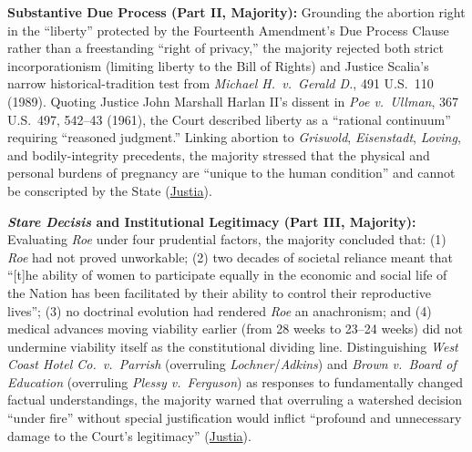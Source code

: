 \documentclass[12pt]{article}
\begin{document}
\textbf{Substantive Due Process (Part II, Majority):} Grounding the abortion right in the ``liberty'' protected by the Fourteenth Amendment's Due Process Clause rather than a freestanding ``right of privacy,'' the majority rejected both strict incorporationism (limiting liberty to the Bill of Rights) and Justice Scalia's narrow historical-tradition test from \textit{Michael H.\ v.\ Gerald D.}, 491 U.S.\ 110 (1989). Quoting Justice John Marshall Harlan II's dissent in \textit{Poe v.\ Ullman}, 367 U.S.\ 497, 542--43 (1961), the Court described liberty as a ``rational continuum'' requiring ``reasoned judgment.'' Linking abortion to \textit{Griswold}, \textit{Eisenstadt}, \textit{Loving}, and bodily-integrity precedents, the majority stressed that the physical and personal burdens of pregnancy are ``unique to the human condition'' and cannot be conscripted by the State (\href{https://supreme.justia.com/cases/federal/us/505/833/}{Justia}).

\textbf{\textit{Stare Decisis} and Institutional Legitimacy (Part III, Majority):} Evaluating \textit{Roe} under four prudential factors, the majority concluded that: (1) \textit{Roe} had not proved unworkable; (2) two decades of societal reliance meant that ``[t]he ability of women to participate equally in the economic and social life of the Nation has been facilitated by their ability to control their reproductive lives''; (3) no doctrinal evolution had rendered \textit{Roe} an anachronism; and (4) medical advances moving viability earlier (from 28 weeks to 23--24 weeks) did not undermine viability itself as the constitutional dividing line. Distinguishing \textit{West Coast Hotel Co.\ v.\ Parrish} (overruling \textit{Lochner}/\textit{Adkins}) and \textit{Brown v.\ Board of Education} (overruling \textit{Plessy v.\ Ferguson}) as responses to fundamentally changed factual understandings, the majority warned that overruling a watershed decision ``under fire'' without special justification would inflict ``profound and unnecessary damage to the Court's legitimacy'' (\href{https://supreme.justia.com/cases/federal/us/505/833/}{Justia}).
\end{document}
